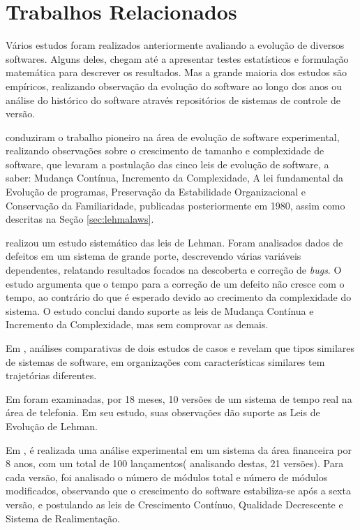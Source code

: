 \chapter{Trabalhos Relacionados}
\label{chapter:trabalhosRelacionados}

Vários estudos foram realizados anteriormente avaliando a evolução de diversos softwares. Alguns deles, chegam até a apresentar testes estatísticos e formulação matemática para descrever os resultados\cite{neamtiu2013towards}. Mas a grande maioria dos estudos são empíricos, realizando observação da evolução do software ao longo dos anos ou análise do histórico do software através repositórios de sistemas de controle de versão\cite{israeli2010linux,schach2002maintainability,skoulis2014open}.

\cite{belady1976model} conduziram o trabalho pioneiro na área de evolução de software experimental, realizando observações sobre o crescimento  de tamanho e complexidade de software, que levaram a postulação das cinco leis de evolução de software, a saber: Mudança Contínua, Incremento da Complexidade, A lei fundamental da Evolução de programas, Preservação da Estabilidade Organizacional e Conservação da Familiaridade, publicadas posteriormente em 1980, assim como descritas na Seção \ref{sec:lehmalaws}.

\cite{chong1986empirical,yuen1987statistical,chong1988analyzing} realizou um estudo sistemático das leis de Lehman. Foram analisados dados de defeitos em um sistema de grande porte, descrevendo várias variáveis dependentes, relatando resultados focados na descoberta e correção de \textit{bugs}. O estudo argumenta que o tempo para a correção de um defeito não cresce com o tempo, ao contrário do que é esperado devido ao crecimento da complexidade do sistema. O estudo conclui dando suporte as leis de Mudança Contínua e Incremento da Complexidade, mas sem comprovar as demais.

Em \cite{bendifallah1987understanding}, análises comparativas de dois estudos de casos e revelam que tipos similares de sistemas de software, em organizações com características similares tem trajetórias diferentes.

Em \cite{cook1994real} foram examinadas, por 18 meses, 10 versões de um sistema de tempo real na área de telefonia. Em seu estudo, suas observações dão suporte as Leis de Evolução de Lehman.

Em \cite{lehman1996laws}, é realizada uma análise experimental em um sistema da área financeira por 8 anos, com um total de 100 lançamentos( analisando destas, 21 versões). Para cada versão, foi analisado o número de módulos total e número de módulos modificados, observando que o crescimento do software estabiliza-se após a sexta versão, e postulando as leis de Crescimento Contínuo, Qualidade Decrescente e Sistema de Realimentação.

